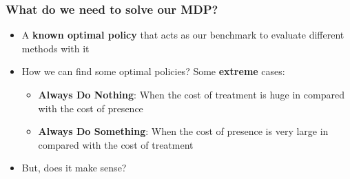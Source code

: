 \documentclass[aspectratio=169]{beamer}
\begin{document}
\begin{frame}
	\frametitle{What do we need to solve our MDP?}
	\begin{itemize}
		\item A \textbf{known optimal policy} that acts as our benchmark to evaluate different methods with it 
		\item How we can find some optimal policies? Some \textbf{extreme} cases:
		\begin{itemize}
			\item \textbf{Always Do Nothing}: When the cost of treatment is huge in compared with the cost of presence
			\item \textbf{Always Do Something}: When the cost of presence is very large in compared with the cost of treatment
		\end{itemize}
		\item But, does it make sense?
	\end{itemize}
\end{frame}
\end{document}

